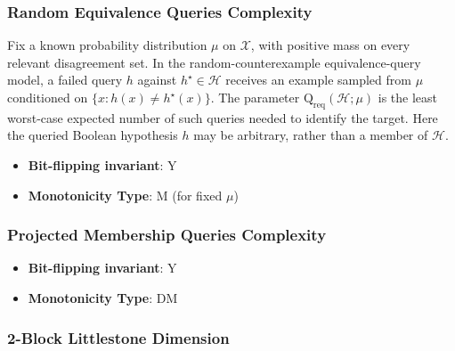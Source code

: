 \subsubsection{Random Equivalence Queries Complexity}
      
      \begin{definition}\label{def:random_equivalence_queries_complexity}
      Fix a known probability distribution $\mu$ on $\mathcal X$, with positive mass on every relevant disagreement set.  In the random-counterexample equivalence-query model, a failed query $h$ against $h^\star\in\mathcal H$ receives an example sampled from $\mu$ conditioned on $\{x:h(x)\ne h^\star(x)\}$.  The parameter $\mathrm Q_{\mathrm{req}}(\mathcal H;\mu)$ is the least worst-case expected number of such queries needed to identify the target.  Here the queried Boolean hypothesis $h$ may be arbitrary, rather than a member of $\mathcal H$.
      \end{definition}
      \begin{itemize}
      \item {\bf Bit-flipping invariant}: Y
      \item {\bf Monotonicity Type}: M (for fixed $\mu$)
      \end{itemize}
\subsubsection{Projected Membership Queries Complexity}
      
      \begin{definition}\label{def:projected_membership_queries_complexity}
      
      \end{definition}
      \begin{itemize}
      \item {\bf Bit-flipping invariant}: Y
      \item {\bf Monotonicity Type}: DM
      \end{itemize}
\subsubsection{2-Block Littlestone Dimension}
      

